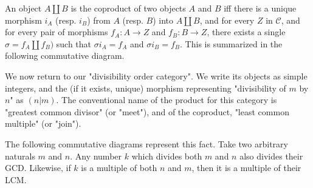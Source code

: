 \documentclass[12pt, letterpaper, twoside]{report}
\begin{document}
An object $A \coprod B$ is the coproduct of two objects $A$ and $B$ iff there is a unique morphism $i_A$ (resp. $i_B$) from $A$ (resp. $B$) into $A \coprod B$, and for every $Z$ in $\mathcal{C}$, and for every pair of morphisms $f_A : A \to Z$ and $f_B : B \to Z$, there exists a single $\sigma = f_A \coprod f_B)$ such that $\sigma i_A = f_A$ and $\sigma i_B = f_B$. This is summarized in the following commutative diagram.


We now return to our "divisibility order category". We write its objects as simple integers, and the (if it exists, unique) morphism representing "divisibility of $m$ by $n$" as $(n | m)$. The conventional name of the product for this category is "greatest common divisor" (or "meet"), and of the coproduct, "least common multiple" (or "join").

The following commutative diagrams represent this fact. Take two arbitrary naturals $m$ and $n$. Any number $k$ which divides both $m$ and $n$ also divides their GCD. Likewise, if $k$ is a multiple of both $n$ and $m$, then it is a multiple of their LCM. 


\end{document}
